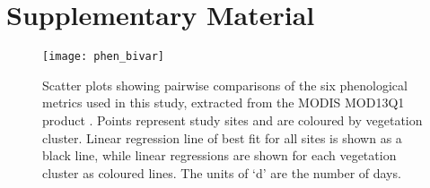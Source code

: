 \documentclass[11pt,a4paper]{article}
\newcommand{\beginsupplement}{%
	\setcounter{table}{0}
	\renewcommand{\thetable}{S\arabic{table}}%
	\setcounter{figure}{0}
	\renewcommand{\thefigure}{S\arabic{figure}}%
	}
\begin{document}
\printbibliography

\section{Supplementary Material}
\beginsupplement

\begin{figure}[H]
\centering
	\texttt{[image: phen\_bivar]}
	\caption{Scatter plots showing pairwise comparisons of the six phenological metrics used in this study, extracted from the MODIS MOD13Q1 product \citep{MOD13Q1}. Points represent study sites and are coloured by vegetation cluster. Linear regression line of best fit for all sites is shown as a black line, while linear regressions are shown for each vegetation cluster as coloured lines. The units of `d' are the number of days.}
	\label{phen_bivar}
\end{figure}
\end{document}
